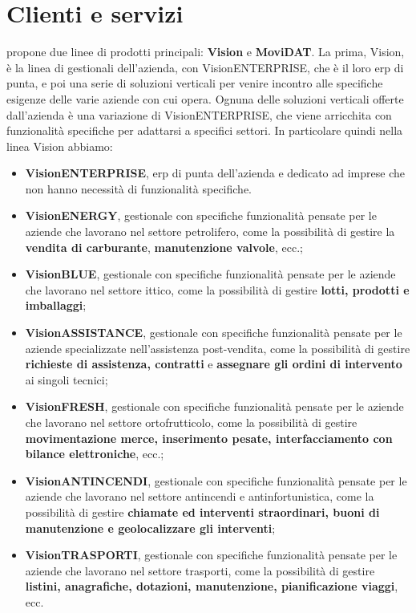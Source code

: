\section{Clienti e servizi}
{\company} propone due linee di prodotti principali: \textbf{Vision} e \textbf{MoviDAT}.
La prima, Vision, è la linea di gestionali dell'azienda, con VisionENTERPRISE, che è il loro \gls{erp} di punta, 
e poi una serie di soluzioni verticali per venire incontro alle specifiche esigenze delle varie aziende con cui {\company} opera.
Ognuna delle soluzioni verticali offerte dall'azienda è una variazione di VisionENTERPRISE, che viene arricchita con 
funzionalità specifiche per adattarsi a specifici settori. In particolare quindi nella linea Vision abbiamo:
\begin{itemize}
      \item \textbf{VisionENTERPRISE}, \gls{erp} di punta dell'azienda e dedicato ad imprese che non hanno necessità di funzionalità 
      specifiche.
      \item \textbf{VisionENERGY}, gestionale con specifiche funzionalità pensate per le aziende che lavorano nel settore petrolifero, 
      come la possibilità di gestire la \textbf{vendita di carburante}, \textbf{manutenzione valvole}, ecc.;
      \item \textbf{VisionBLUE}, gestionale con specifiche funzionalità pensate per le aziende che lavorano nel settore ittico, 
      come la possibilità di gestire \textbf{lotti, prodotti e imballaggi};
      \item \textbf{VisionASSISTANCE}, gestionale con specifiche funzionalità pensate per le aziende specializzate nell'assistenza post-vendita, 
      come la possibilità di gestire \textbf{richieste di assistenza, contratti} e \textbf{assegnare gli ordini di intervento} ai 
      singoli tecnici;
      \item \textbf{VisionFRESH}, gestionale con specifiche funzionalità pensate per le aziende che lavorano nel settore ortofrutticolo, 
      come la possibilità di gestire \textbf{movimentazione merce, inserimento pesate, interfacciamento con bilance elettroniche}, ecc.;
      \item \textbf{VisionANTINCENDI}, gestionale con specifiche funzionalità pensate per le aziende che lavorano nel settore antincendi e antinfortunistica, 
      come la possibilità di gestire \textbf{chiamate ed interventi straordinari, buoni di manutenzione e geolocalizzare gli interventi};
      \item \textbf{VisionTRASPORTI}, gestionale con specifiche funzionalità pensate per le aziende che lavorano nel settore trasporti, 
      come la possibilità di gestire \textbf{listini, anagrafiche, dotazioni, manutenzione, pianificazione viaggi}, ecc.
\end{itemize}
